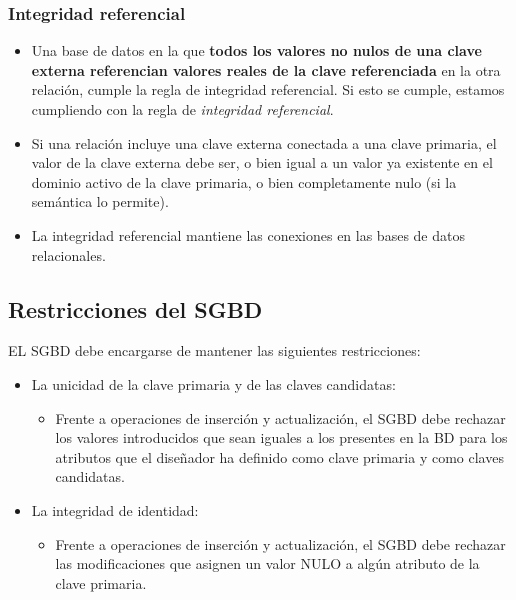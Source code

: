 \subsubsection*{Integridad referencial}
\begin{itemize}
    \item Una base de datos en la que \textbf{todos los valores no nulos de una clave externa referencian valores reales de la clave referenciada} en la otra relación, cumple la regla de integridad referencial. Si esto se cumple, estamos cumpliendo con la regla de \textit{integridad referencial}.
    \item Si una relación incluye una clave externa conectada a una clave primaria, el valor de la clave externa debe ser, o bien igual a un valor ya existente en el dominio activo de la clave primaria, o bien completamente nulo (si la semántica lo permite).
    \item La integridad referencial mantiene las conexiones en las bases de datos relacionales.
\end{itemize}

\subsection*{Restricciones del SGBD}

EL SGBD debe encargarse de mantener las siguientes restricciones:
\begin{itemize}
    \item La unicidad de la clave primaria y de las claves candidatas:
    \begin{itemize}
        \item Frente a operaciones de inserción y actualización, el SGBD debe rechazar los valores introducidos que sean iguales a los presentes en la BD para los atributos que el diseñador ha definido como clave primaria y como claves candidatas.
    \end{itemize}
    \item La integridad de identidad:
    \begin{itemize}
        \item Frente a operaciones de inserción y actualización, el SGBD debe rechazar las modificaciones que asignen un valor NULO a algún atributo de la clave primaria.
    \end{itemize}
\end{itemize}


